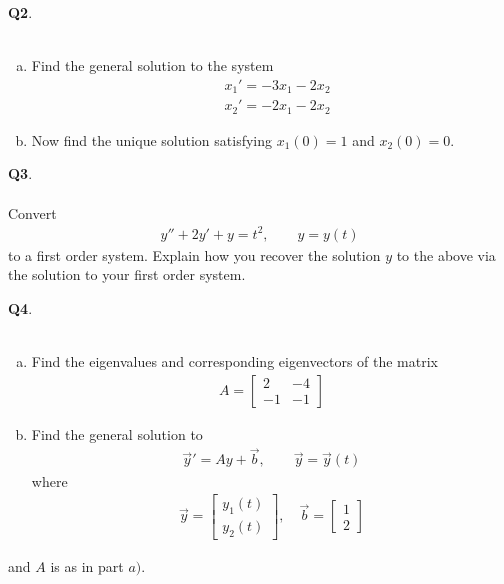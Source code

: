 \documentclass[12pt, oneside]{amsart}
\begin{document}
\newpage
\noindent
\textbf{Q2}. \\ \\ 
\begin{enumerate}[a)]
    \item
Find the general solution to the system
\begin{equation*}
\begin{split}
& x_1' = -3x_1 - 2x_2
\\
& x_2' = -2x_1 - 2 x_2
\end{split}
\end{equation*}



\vspace{5in}
\item
    Now find the unique solution satisfying $x_1(0) = 1$ and $x_2(0) = 0$. 
\end{enumerate}

\newpage
\noindent
\textbf{Q3}. \\ \\ 
Convert
\begin{align*}
y'' + 2y' + y = t^2, \qquad y = y(t)
\end{align*}
to a first order system. Explain how you recover the solution $y$
to the above via the solution to your first order system.
        \newpage

\noindent
\textbf{Q4}. \\ \\ 
\begin{enumerate}[a)]
\item
Find the eigenvalues and corresponding eigenvectors of the matrix
\begin{align*}
A = \begin{bmatrix}
2 & -4 \\
-1 & -1
\end{bmatrix}
\end{align*}
\vspace{3in}
\item
Find the general solution to
\begin{align*}
\vec{y}' = Ay + \vec{b}, \qquad \vec{y} = \vec{y}(t)
\end{align*}
where
\begin{align*}
\vec{y} = \begin{bmatrix}
y_1(t) \\
y_2(t)
\end{bmatrix}, \quad
\vec{b} = \begin{bmatrix}
1 \\
2
\end{bmatrix}
\end{align*}
\end{enumerate}
and $A$ is as in part $a)$.
        \newpage
\end{document}
